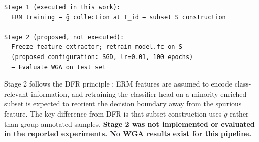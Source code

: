 \begin{verbatim}
Stage 1 (executed in this work):
  ERM training → g̃ collection at T_id → subset S construction

Stage 2 (proposed, not executed):
  Freeze feature extractor; retrain model.fc on S
  (proposed configuration: SGD, lr=0.01, 100 epochs)
  → Evaluate WGA on test set
\end{verbatim}

Stage 2 follows the DFR principle \citep{Kirichenko2022Last}: ERM features are assumed to encode class-relevant information, and retraining the classifier head on a minority-enriched subset is expected to reorient the decision boundary away from the spurious feature. The key difference from DFR is that subset construction uses $\tilde{g}$ rather than group-annotated samples. \textbf{Stage 2 was not implemented or evaluated in the reported experiments. No WGA results exist for this pipeline.}


